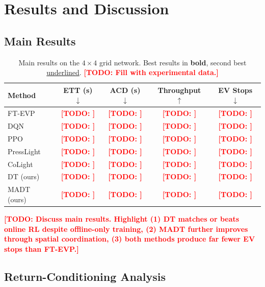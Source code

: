 \documentclass[journal]{IEEEtran}
\newcommand{\todo}[1]{\textcolor{red}{\textbf{[TODO: #1]}}}
\begin{document}
\section{Results and Discussion}
\label{sec:results}

\subsection{Main Results}
\label{sec:results:main}

\begin{table}[t]
  \centering
  \caption{Main results on the $4\times4$ grid network.  Best results
    in \textbf{bold}, second best \underline{underlined}.
    \todo{Fill with experimental data.}}
  \label{tab:main}
  \begin{tabular}{lcccc}
    \toprule
    \textbf{Method} & \textbf{ETT (s) $\downarrow$}
      & \textbf{ACD (s) $\downarrow$}
      & \textbf{Throughput $\uparrow$}
      & \textbf{EV Stops $\downarrow$} \\
    \midrule
    FT-EVP          & \todo{} & \todo{} & \todo{} & \todo{} \\
    DQN             & \todo{} & \todo{} & \todo{} & \todo{} \\
    PPO             & \todo{} & \todo{} & \todo{} & \todo{} \\
    PressLight      & \todo{} & \todo{} & \todo{} & \todo{} \\
    CoLight         & \todo{} & \todo{} & \todo{} & \todo{} \\
    \midrule
    DT (ours)       & \todo{} & \todo{} & \todo{} & \todo{} \\
    MADT (ours)     & \todo{} & \todo{} & \todo{} & \todo{} \\
    \bottomrule
  \end{tabular}
\end{table}

\todo{Discuss main results.  Highlight (1) DT matches or beats online
RL despite offline-only training, (2) MADT further improves through
spatial coordination, (3) both methods produce far fewer EV stops than
FT-EVP.}

\subsection{Return-Conditioning Analysis}
\label{sec:results:return}
\end{document}

